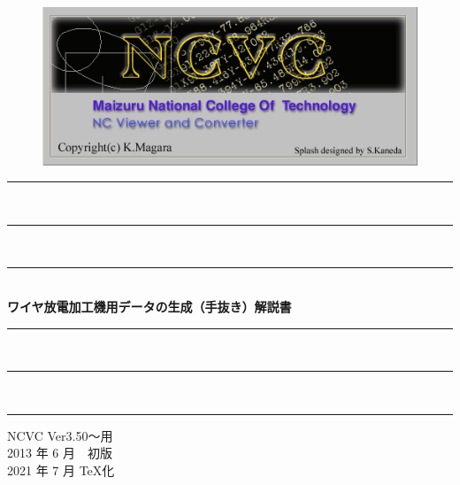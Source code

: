 
\vspace*{4zh}
\begin{figure}[H]
\centering
\includegraphics[scale=1.2]{logo.png}
\end{figure}

\vspace*{3zh}
\begin{center}
    \rule{11cm}{0.2zw}\\[-0.5zh]
    \rule{10cm}{0.1zw}\\[-0.5zh]
    \rule{9cm}{0.05zw}\\[1zh]
    {\Large \textbf{ワイヤ放電加工機用データの生成}}\textbf{（手抜き）}{\Large \textbf{解説書}}\\
    \rule{9cm}{0.05zw}\\[-0.5zh]
    \rule{10cm}{0.1zw}\\[-0.5zh]
    \rule{11cm}{0.2zw}

    \vspace*{8cm}
    NCVC Ver3.50～用\\
    2013 年 6 月　初版\\
    2021 年 7 月 \TeX 化
\end{center}
